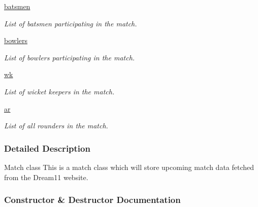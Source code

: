 \begin{DoxyCompactItemize}
\hyperlink{classproject_1_1Match_a439f5a30383147cc4f0d3ef0fc65e57b}{batsmen}
\begin{DoxyCompactList}\small\item\em List of batsmen participating in the match. \end{DoxyCompactList}\item 
\hyperlink{classproject_1_1Match_a72f5836dc303871b4d19b44895b8f012}{bowlers}
\begin{DoxyCompactList}\small\item\em List of bowlers participating in the match. \end{DoxyCompactList}\item 
\hyperlink{classproject_1_1Match_aaed99cf294a0dc51d89caccf11307842}{wk}
\begin{DoxyCompactList}\small\item\em List of wicket keepers in the match. \end{DoxyCompactList}\item 
\hyperlink{classproject_1_1Match_a6179b09b7054234d1a6f248a60f9e7f8}{ar}
\begin{DoxyCompactList}\small\item\em List of all rounders in the match. \end{DoxyCompactList}\end{DoxyCompactItemize}


\subsubsection{Detailed Description}
\begin{DoxyVerb}Match class
This is a match class which will store upcoming match data fetched from the Dream11 website.
\end{DoxyVerb}
 

\subsubsection{Constructor \& Destructor Documentation}
\mbox{\label{classproject_1_1Match_ad2fa413ba7c2d3aee59ab1996aa8ceeb}} 
